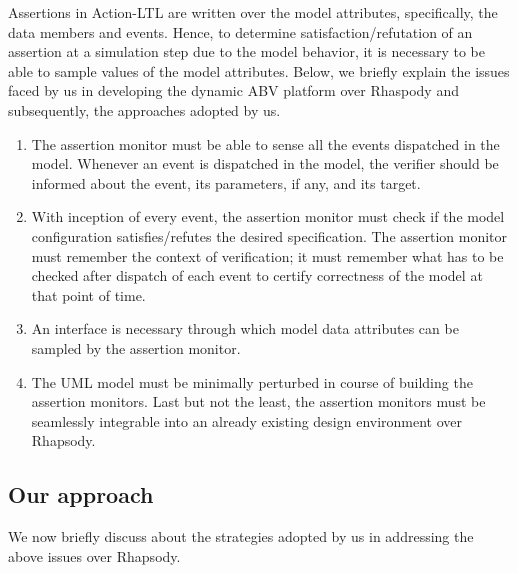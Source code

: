 \noindent
Assertions in Action-LTL are written over the model attributes, specifically, 
the data members and events.
Hence, to determine satisfaction/refutation of an assertion at a simulation 
step due to the model behavior, it is necessary to be able to sample values 
of the model attributes. 
Below, we briefly explain the issues faced by us in 
developing the dynamic ABV platform over Rhaspody and subsequently, the 
approaches adopted by us.
 
\begin{enumerate}
\item The assertion monitor 
must be able to sense all the events dispatched in the model. Whenever an 
event is dispatched in the model, the verifier should be informed about the 
event, its parameters, if any, and its target. 

\item With inception of every event, the assertion monitor 
must check if the model configuration satisfies/refutes the desired 
specification.
The assertion monitor must remember the context of verification; it must
remember what has to be checked after dispatch of each event to certify 
correctness of the model at that point of time. 

\item An interface is necessary through which model data attributes can 
be sampled by the assertion monitor. 


\item The UML model must be minimally perturbed in course of 
building the assertion monitors. Last but not the least, the assertion 
monitors must be seamlessly integrable into an already existing design 
environment over Rhapsody.
\end{enumerate}

\subsection{Our approach}
\noindent
We now briefly discuss about the strategies adopted by us in addressing the 
above issues over Rhapsody. 


